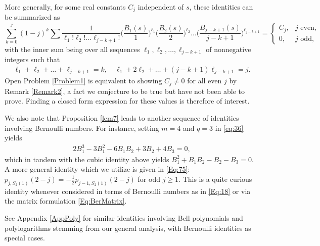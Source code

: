 \documentclass[letterpaper,10pt]{amsart}
\numberwithin{equation}{section}
\begin{document}
More generally, for some real constants $C_j$ independent of $s$, these identities can be summarized as
\begin{equation}\label{Eq:18}
\sum_{k=0}^j (1-j)^k \sum \frac{1}{\ell_1!\ell_2!\dots \ell_{j-k+1}!}\bigg(\frac{B_1(s)}{1}\bigg)^{\ell_1} \bigg(\frac{B_2(s)}{2}\bigg)^{\ell_2} \dots \bigg(\frac{B_{j-k+1}(s)}{j-k+1}\bigg)^{\ell_{j-k+1}}=\begin{cases}
C_j,& j \text{ even},\\
0,& j \text{ odd},
\end{cases}
\end{equation}
with the inner sum being over all sequences $\ell_1,\ell_2,\dots,\ell_{j-k+1}$ of nonnegative integers such that
\begin{align}
\ell_1+\ell_2+\dots+\ell_{j-k+1}=k,\quad \ell_1+2\ell_2+\dots+(j-k+1)\ell_{j-k+1}=j.
\end{align}
Open Problem \ref{Problem1} is equivalent to showing $C_j\neq0$ for all even $j$ by Remark \ref{Remark2}, a fact we conjecture to be true but have not been able to prove. Finding a closed form expression for these values is therefore of interest.

We also note that Proposition \ref{lem7} leads to another sequence of identities involving Bernoulli numbers. For instance, setting $m =4$ and $q= 3$ in \eqref{eq:36} yields
\begin{align}
    2B_1^3 -3B_1^2-6B_1B_2+3B_2+4B_3=0,
\end{align}
which in tandem with the cubic identity above yields $B_1^2 +B_1B_2-B_2-B_3 =0$. A more general identity which we utilize is given in \eqref{Eq:75}: $p_{j,S_2(1)}(2-j)=-\frac{1}{2} p_{j-1,S_2(1)}(2-j)$ for odd $j\geq1$. This is a quite curious identity whenever considered in terms of Bernoulli numbers as in \eqref{Eq:18} or via the matrix formulation \eqref{Eq:BerMatrix}.

See Appendix \ref{AppPoly} for similar identities involving Bell polynomials and polylogarithms stemming from our general analysis, with Bernoulli identities as special cases.
\end{document}
